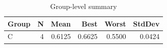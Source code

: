 \begin{table}[htbp]
\centering
\caption{Group-level summary}
\label{tab:group-summary}
\begin{tabular}{lrrrrr}
\toprule
\textbf{Group} & \textbf{N} & \textbf{Mean} & \textbf{Best} & \textbf{Worst} & \textbf{StdDev} \\
\midrule
C & 4 & 0.6125 & 0.6625 & 0.5500 & 0.0424 \\
\bottomrule
\end{tabular}
\end{table}